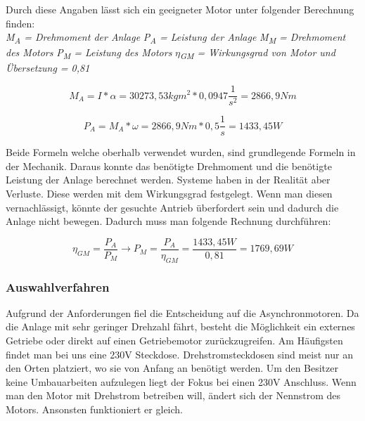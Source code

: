 \documentclass[12pt]{scrreprt} %
\begin{document}
Durch diese Angaben lässt sich ein geeigneter Motor unter folgender Berechnung finden:
\\
\textit{M\textsubscript{A} = Drehmoment der Anlage} \newline
\textit{P\textsubscript{A} = Leistung der Anlage} \newline
\textit{M\textsubscript{M} = Drehmoment des Motors} \newline
\textit{P\textsubscript{M} = Leistung des Motors} \newline
\textit{$\eta$\textsubscript{GM} = Wirkungsgrad von Motor und Übersetzung = 0,81}


\begin{center}
\begin{equation}
  \label{eq:2}
	M_{A} = I * \alpha = 30273,53kgm^2 * 0,0947 \dfrac{1}{s^2} = 2866,9 Nm
\end{equation} 
\end{center}


 
\begin{center}
\begin{equation}
  \label{eq:3}
	P_{A} = M_{A} * \omega = 2866,9 Nm * 0,5 \dfrac{1}{s} = 1433,45W
\end{equation} 
\end{center}

Beide Formeln welche oberhalb verwendet wurden, sind grundlegende Formeln in der Mechanik. Daraus konnte das benötigte Drehmoment und die benötigte Leistung der Anlage berechnet werden. Systeme haben in der Realität aber Verluste. Diese werden mit dem Wirkungsgrad festgelegt. Wenn man diesen vernachlässigt, könnte der gesuchte Antrieb überfordert sein und dadurch die Anlage nicht bewegen. Dadurch muss man folgende Rechnung durchführen:

\begin{center}
\begin{equation}
  \label{eq:4}
	\eta_{GM}= \frac{P_{A}}{P_{M}} \rightarrow P_{M} = \frac{P_{A}}{\eta_{GM}} = \frac{1433,45W}{0,81} = 1769,69W
\end{equation} 
\end{center}




\subsubsection{Auswahlverfahren}
\label{sec:auswahlverfahren}

Aufgrund der Anforderungen fiel die Entscheidung auf die Asynchronmotoren. Da die Anlage mit sehr geringer Drehzahl fährt, besteht die Möglichkeit ein externes Getriebe oder direkt auf einen Getriebemotor zurückzugreifen. 
Am Häufigsten findet man bei uns eine 230V Steckdose. Drehstromsteckdosen sind meist nur an den Orten platziert, wo sie von Anfang an benötigt werden. Um den Besitzer keine Umbauarbeiten aufzulegen liegt der Fokus bei einen 230V Anschluss. Wenn man den Motor mit Drehstrom betreiben will, ändert sich der Nennstrom des Motors. Ansonsten funktioniert er gleich.
\end{document}
